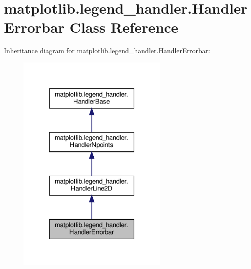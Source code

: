 \hypertarget{classmatplotlib_1_1legend__handler_1_1HandlerErrorbar}{}\section{matplotlib.\+legend\+\_\+handler.\+Handler\+Errorbar Class Reference}
\label{classmatplotlib_1_1legend__handler_1_1HandlerErrorbar}


Inheritance diagram for matplotlib.\+legend\+\_\+handler.\+Handler\+Errorbar\+:
\nopagebreak
\begin{figure}[H]
\begin{center}
\leavevmode
\includegraphics[width=210pt]{classmatplotlib_1_1legend__handler_1_1HandlerErrorbar__inherit__graph}
\end{center}
\end{figure}


